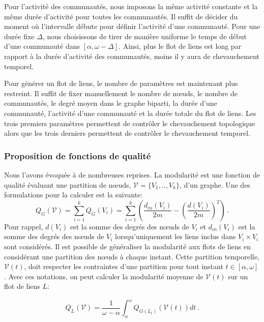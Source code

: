 Pour l'activité des communautés, nous imposons la même activité constante et la même durée d'activité pour toutes les communautés.
Il suffit de décider du moment où l'intervalle débute pour définir l'activité d'une communauté.
Pour une durée fixe $\Delta$, nous choisissons de tirer de manière uniforme le temps de début d'une communauté dans $[\alpha,\omega-\Delta]$.
Ainsi, plus le flot de liens est long par rapport à la durée d'activité des communautés, moins il y aura de chevauchement temporel.

\bigskip
Pour générer un flot de liens, le nombre de paramètres est maintenant plus restreint.
Il suffit de fixer manuellement le nombre de n\oe{}uds, le nombre de communautés, le degré moyen dans le graphe biparti, la durée d'une communauté, l'activité d'une communauté et la durée totale du flot de liens.
Les trois premiers paramètres permettent de contrôler le chevauchement topologique alors que les trois derniers permettent de contrôler le chevauchement temporel.

\subsubsection{Proposition de fonctions de qualité}

Nous l'avons évoquée à de nombreuses reprises.
La modularité est une fonction de qualité évaluant une partition de n\oe{}uds, $\mathcal{V}=\{V_1,..,V_k\}$, d'un graphe.
Une des formulations pour la calculer est la suivante:
\begin{equation}
Q_G(\mathcal{V}) =  \sum_{i=1}^{k} Q_G(V_i) =\sum_{i=1}^{k} \left( \dfrac{d_{in}(V_i)}{2m}- \left(\dfrac{d(V_i)}{2m}\right)^2\right)\,.
\end{equation}
Pour rappel, $d(V_i)$ est la somme des degrés des n\oe{}uds de $V_i$ et $d_{in}(V_i)$ est la somme des degrés des n\oe{}uds de $V_i$ lorsqu'uniquement les liens inclus dans $V_i \times V_i$ sont considérés.
Il est possible de généraliser la modularité aux flots de liens en considérant une partition des n\oe{}uds à chaque instant.
Cette partition temporelle, $\mathcal{V}(t)$, doit respecter les contraintes d'une partition pour tout instant $t \in [\alpha,\omega]$.
Avec ces notations, on peut calculer la modularité moyenne de $\mathcal{V}(t)$ sur un flot de liens $L$:

\begin{equation}
Q_L(\mathcal{V}) = \dfrac{1}{\omega-\alpha} \int_{\alpha}^{\omega} Q_{G(L_t)}(\mathcal{V}(t)) dt\,.
\label{eq:temp_modu}
\end{equation}

